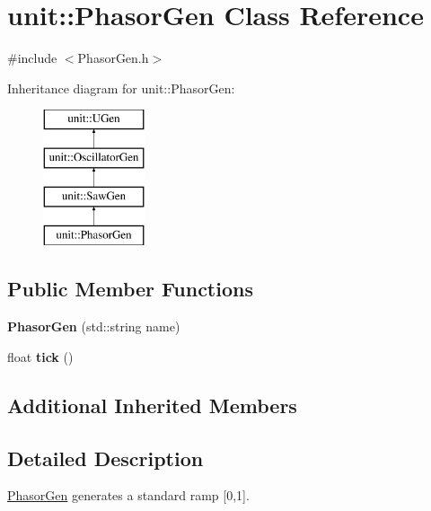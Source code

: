 \hypertarget{classunit_1_1PhasorGen}{\section{unit\-:\-:Phasor\-Gen Class Reference}
\label{classunit_1_1PhasorGen}
}


{\ttfamily \#include $<$Phasor\-Gen.\-h$>$}

Inheritance diagram for unit\-:\-:Phasor\-Gen\-:\begin{figure}[H]
\begin{center}
\leavevmode
\includegraphics[height=4.000000cm]{classunit_1_1PhasorGen}
\end{center}
\end{figure}
\subsection*{Public Member Functions}
\begin{DoxyCompactItemize}
\item 
\hypertarget{classunit_1_1PhasorGen_a726fab6730e45d7fbf242f4613837e28}{{\bfseries Phasor\-Gen} (std\-::string name)}\label{classunit_1_1PhasorGen_a726fab6730e45d7fbf242f4613837e28}

\item 
\hypertarget{classunit_1_1PhasorGen_a056953090628af9868e4778d15daf79a}{float {\bfseries tick} ()}\label{classunit_1_1PhasorGen_a056953090628af9868e4778d15daf79a}

\end{DoxyCompactItemize}
\subsection*{Additional Inherited Members}


\subsection{Detailed Description}
\hyperlink{classunit_1_1PhasorGen}{Phasor\-Gen} generates a standard ramp \mbox{[}0,1\mbox{]}.

